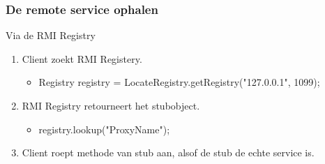 \documentclass[a4paper,12pt]{article}
\begin{document}
\subsubsection{De remote service ophalen}
Via de RMI Registry
\begin{enumerate}
\item Client zoekt RMI Registery.
	\begin{itemize}
	\item Registry registry = LocateRegistry.getRegistry("127.0.0.1", 1099);
	\end{itemize}
\item RMI Registry retourneert het stubobject.
	\begin{itemize}
	\item registry.lookup("ProxyName");
	\end{itemize}
\item Client roept methode van stub aan, alsof de stub de echte service is. 
\end{enumerate}
\end{document}

